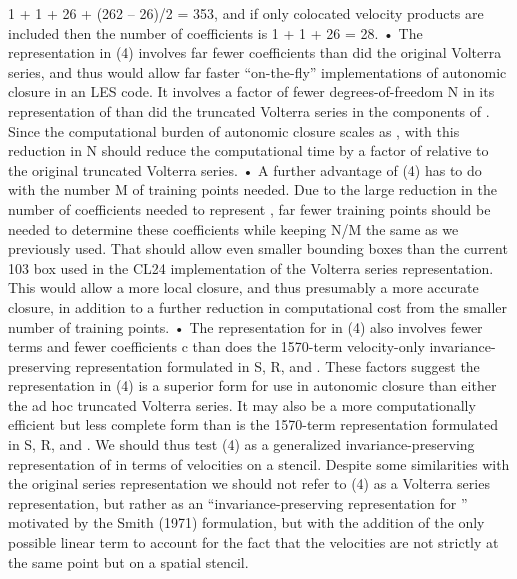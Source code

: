 1 + 1 + 26 + (262 – 26)/2 = 353, and if only colocated velocity products are included then the number of coefficients is 1 + 1 + 26 = 28.
•	The representation in (4) involves far fewer coefficients than did the original Volterra series, and thus would allow far faster “on-the-fly” implementations of autonomic closure in an LES code. It involves a factor of   fewer degrees-of-freedom N in its representation of   than did the truncated Volterra series in the components of  . Since the computational burden of autonomic closure scales as  , with   this reduction in N should reduce the computational time by a factor of   relative to the original truncated Volterra series.
•	A further advantage of (4) has to do with the number M of training points needed. Due to the large reduction in the number of coefficients needed to represent  , far fewer training points should be needed to determine these coefficients while keeping N/M the same as we previously used. That should allow even smaller bounding boxes than the current 103 box used in the CL24 implementation of the Volterra series representation. This would allow a more local closure, and thus presumably a more accurate closure, in addition to a further reduction in computational cost from the smaller number of training points.
•	The representation for   in (4) also involves fewer terms and fewer coefficients c than does the 1570-term velocity-only invariance-preserving representation formulated in S, R,   and  .  
These factors suggest the representation in (4) is a superior form for use in autonomic closure than either the ad hoc truncated Volterra series.  It may also be a more computationally efficient but less complete form than is the 1570-term representation formulated in S, R,   and  .
We should thus test (4) as a generalized invariance-preserving representation of   in terms of velocities   on a   stencil. Despite some similarities with the original series representation we should not refer to (4) as a Volterra series representation, but rather as an “invariance-preserving representation for  ” motivated by the Smith (1971) formulation, but with the addition of the only possible linear term to account for the fact that the velocities are not strictly at the same point but on a spatial stencil.

